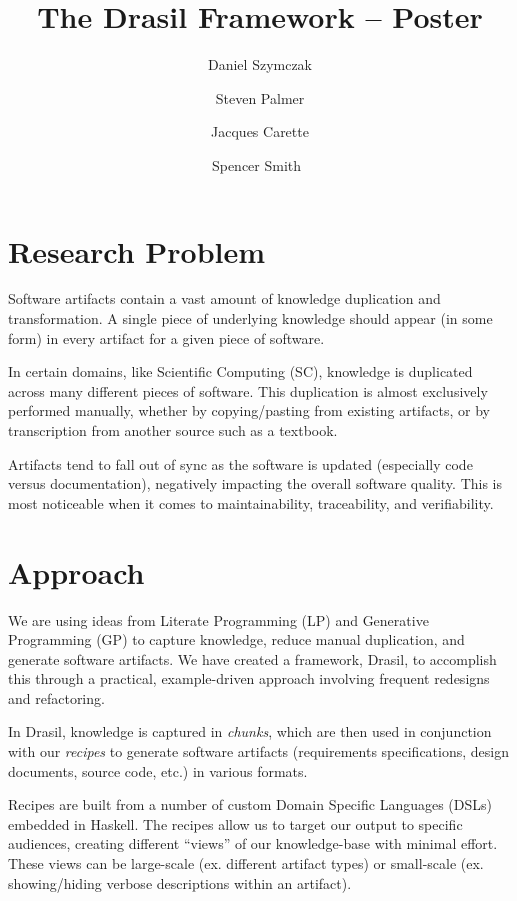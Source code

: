 \documentclass[twocolumn, 10pt]{article} %
\title{The Drasil Framework -- Poster}
\author{
  Daniel Szymczak
  \and
  Steven Palmer
  \and
  Jacques Carette
  \and
  Spencer Smith\
}
\begin{document}
\maketitle

\section{Research Problem}

Software artifacts contain a vast amount of knowledge duplication and
transformation. A single piece of underlying knowledge should appear (in some
form) in every artifact for a given piece of software.

In certain domains,
like Scientific Computing (SC),
knowledge is duplicated across many different pieces of software. This
duplication is almost exclusively performed manually, whether by copying/pasting
from existing artifacts, or by transcription from another source such as a textbook.

Artifacts tend to fall out of sync as the software is updated 
(especially code versus documentation),
negatively impacting the overall software quality. This is most noticeable 
when it comes to maintainability, traceability, and verifiability.

\section{Approach}

We are using ideas from Literate Programming (LP) and Generative Programming
(GP) to capture knowledge, reduce manual duplication, and generate software
artifacts. We have created a framework, Drasil, to accomplish this through a
practical, example-driven approach involving frequent redesigns and refactoring.

In Drasil, knowledge is captured in \textit{chunks}, which are then used in
conjunction with our \textit{recipes} to generate software artifacts
(requirements specifications, design documents, source code, etc.) in various
formats.

Recipes are built from a number of custom Domain Specific Languages (DSLs)
embedded in Haskell. The recipes allow us to target our output to specific
audiences, creating different ``views'' of our knowledge-base with minimal
effort. These views can be large-scale (ex. different artifact types) or
small-scale (ex. showing/hiding verbose descriptions within an artifact).
\end{document}
